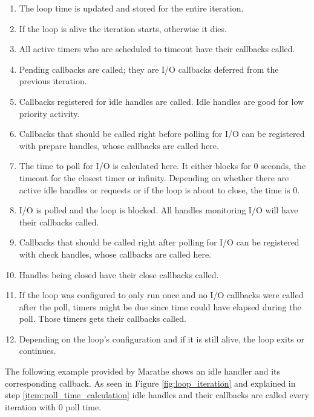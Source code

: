 \begin{enumerate}
  \item The loop time is updated and stored for the entire iteration.
  \item If the loop is alive the iteration starts, otherwise it dies.
  \item All active timers who are scheduled to timeout have their callbacks
    called.
  \item Pending callbacks are called; they are I/O callbacks deferred from the previous
    iteration.
  \item Callbacks registered for idle handles are called. Idle handles are good
    for low priority activity.
  \item Callbacks that should be called right before polling for I/O can be
    registered with prepare handles, whose callbacks are called here.
  \item The time to poll for I/O is calculated here. It either blocks for 0
    seconds, the timeout for the closest timer or infinity. Depending on
    whether there are active idle handles or requests or if the loop is about
    to close, the time is 0. \label{item:poll_time_calculation}
  \item I/O is polled and the loop is blocked. All handles monitoring I/O will
    have their callbacks called.
  \item Callbacks that should be called right after polling for I/O can be
    registered with check handles, whose callbacks are called here.
  \item Handles being closed have their close callbacks called.
  \item If the loop was configured to only run once and no I/O callbacks were
    called after the poll, timers might be due since time could have elapsed
    during the poll. Those timers gets their callbacks called.
  \item Depending on the loop's configuration and if it is still alive, the
    loop exits or continues.
\end{enumerate}

The following example provided by Marathe \cite{uvbook} shows an idle handler
and its corresponding callback. As seen in Figure \ref{fig:loop_iteration} and
explained in step \ref{item:poll_time_calculation} idle handles and their
callbacks are called every iteration with 0 poll time.



